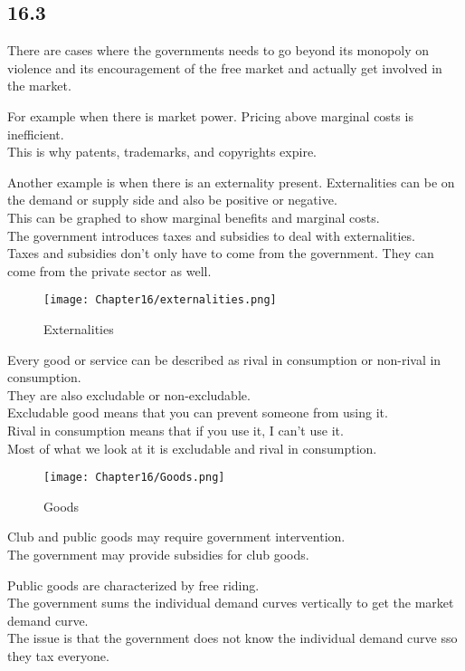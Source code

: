 \subsection*{16.3}
There are cases where the governments needs to go beyond its monopoly on violence 
and its encouragement of the free market and actually get involved in the market.
\par
For example when there is market power. Pricing above marginal costs is inefficient.\\
This is why patents, trademarks, and copyrights expire.
\par
Another example is when there is an externality present. Externalities can be on the demand or supply side and also be positive or negative.\\
This can be graphed to show marginal benefits and marginal costs.\\
The government introduces taxes and subsidies to deal with externalities.\\
Taxes and subsidies don't only have to come from the government. They can come from the private sector as well.
\begin{figure}[H]
    \centering
    \texttt{[image: Chapter16/externalities.png]}
    \caption{Externalities}
    \label{fig:externalities}
\end{figure}
Every good or service can be described as rival in consumption or non-rival in consumption.\\
They are also excludable or non-excludable.\\
Excludable good means that you can prevent someone from using it.\\
Rival in consumption means that if you use it, I can't use it.\\
Most of what we look at it is excludable and rival in consumption.
\begin{figure}[H]
    \centering
    \texttt{[image: Chapter16/Goods.png]}
    \caption{Goods}
    \label{fig:goods}
\end{figure}
Club and public goods may require government intervention.\\
The government may provide subsidies for club goods.
\par
Public goods are characterized by free riding.\\
The government sums the individual demand curves vertically to get the market demand curve.\\
The issue is that the government does not know the individual demand curve sso they tax everyone.
